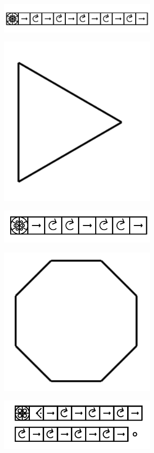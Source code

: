 \documentclass[11pt]{article}
\begin{document}
\includegraphics[width=3in]{image9.png}





\includegraphics[width=3in]{image10.png}

\includegraphics[width=3in]{image11.png}





\includegraphics[width=3in]{image12.png}

\includegraphics[width=3in]{image13.png}
\end{document}
